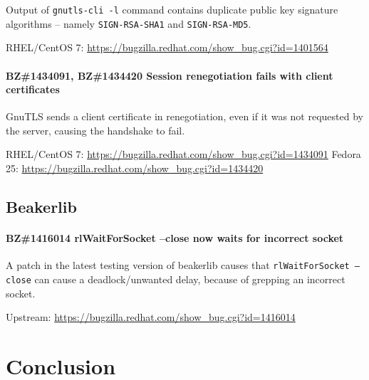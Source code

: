     Output of \texttt{gnutls-cli -l} command contains duplicate public key signature
    algorithms -- namely \texttt{SIGN-RSA-SHA1} and \texttt{SIGN-RSA-MD5}.

    \medskip\noindent RHEL/CentOS 7: \url{https://bugzilla.redhat.com/show_bug.cgi?id=1401564}

\subsubsection*{BZ\#1434091, BZ\#1434420  \newline
    Session renegotiation fails with client certificates}

    GnuTLS sends a client certificate in renegotiation, even if it was not
    requested by the server, causing the handshake to fail.

    \medskip\noindent RHEL/CentOS 7: \url{https://bugzilla.redhat.com/show_bug.cgi?id=1434091}
    \newline\noindent Fedora 25: \url{https://bugzilla.redhat.com/show_bug.cgi?id=1434420}

\section{Beakerlib}
\subsubsection*{BZ\#1416014  \newline
    rlWaitForSocket --close now waits for incorrect socket}

    A patch in the latest testing version of beakerlib causes that
    \texttt{rlWaitForSocket --close} can cause a deadlock/unwanted delay,
    because of grepping an incorrect socket.

    \medskip\noindent Upstream: \url{https://bugzilla.redhat.com/show_bug.cgi?id=1416014}

\chapter {Conclusion} \label{chap:conclusion}

